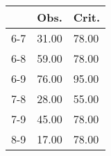 \begin{table}[ht]
\centering
\begin{tabular}{rll}
  \hline
 & Obs. & Crit. \\ 
  \hline
6-7 & 31.00 & 78.00 \\ 
  6-8 & 59.00 & 78.00 \\ 
  6-9 & 76.00 & 95.00 \\ 
  7-8 & 28.00 & 55.00 \\ 
  7-9 & 45.00 & 78.00 \\ 
  8-9 & 17.00 & 78.00 \\ 
   \hline
\end{tabular}
\end{table}
